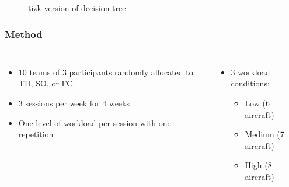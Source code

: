 \documentclass[aspectratio=43, notes]{beamer}
\begin{document}
\begin{frame}
\begin{figure}
	\caption{tizk version of decision tree}
	\label{fig:tsystems}
\end{figure}
\end{frame}

\begin{frame}
\frametitle{Method}
\begin{columns}
	\begin{itemize}[label=$\bullet$]
		\item 10 teams of 3 participants randomly allocated to TD, SO, or FC. 
		\item 3 sessions per week for 4 weeks
		\item One level of workload per session with one repetition
	\end{itemize}
	\begin{itemize}[label=$\bullet$]
		\item 3 workload conditions:
		\begin{itemize}[label = $\bullet$]
			\item Low (6 aircraft)
			\item Medium (7 aircraft)
			\item High (8 aircraft)
		\end{itemize}

	\end{itemize}
\end{columns}
\end{frame}

%
\end{document}
